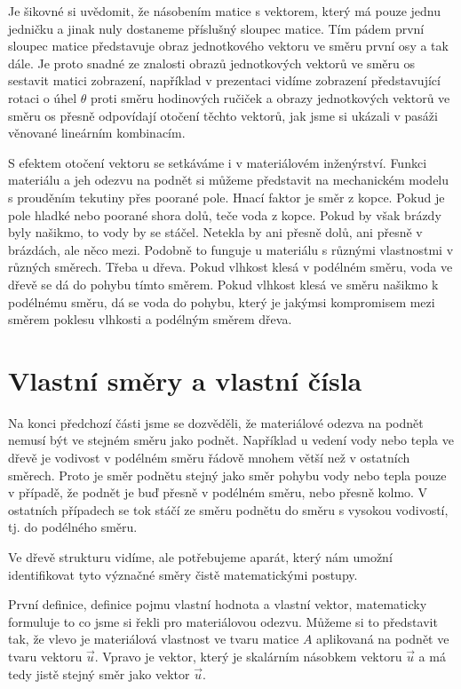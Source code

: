 \documentclass[12pt]{article}
\begin{document}
Je šikovné si uvědomit, že násobením matice s vektorem, který má pouze jednu jedničku a jinak nuly dostaneme příslušný sloupec matice. Tím pádem první sloupec matice představuje obraz jednotkového vektoru ve směru první osy a tak dále. Je proto snadné ze znalosti obrazů jednotkových vektorů ve směru os sestavit matici zobrazení, například v prezentaci vidíme zobrazení představující rotaci o úhel $\theta$ proti směru hodinových ručiček a obrazy jednotkových vektorů ve směru os přesně odpovídají otočení těchto vektorů, jak jsme si ukázali v pasáži věnované lineárním kombinacím.

S efektem otočení vektoru se setkáváme i v materiálovém inženýrství. Funkci materiálu a jeh odezvu na podnět si můžeme představit na mechanickém modelu s prouděním tekutiny přes poorané pole. Hnací faktor je směr z kopce. Pokud je pole hladké nebo poorané shora dolů, teče voda z kopce. Pokud by však brázdy byly našikmo, to vody by se stáčel. Netekla by ani přesně dolů, ani přesně v brázdách, ale něco mezi. Podobně to funguje u materiálu s různými vlastnostmi v různých směrech. Třeba u dřeva. Pokud vlhkost klesá v podélném směru, voda ve dřevě se dá do pohybu tímto směrem. Pokud vlhkost klesá ve směru našikmo k podélnému směru, dá se voda do pohybu, který je jakýmsi kompromisem mezi směrem poklesu vlhkosti a podélným směrem dřeva.

\section{Vlastní směry a vlastní čísla}

Na konci předchozí části jsme se dozvěděli, že materiálové odezva na podnět nemusí být ve stejném směru jako podnět. Například u vedení vody nebo tepla ve dřevě je vodivost v podélném směru řádově mnohem větší než v ostatních směrech. Proto je směr podnětu stejný jako směr pohybu vody nebo tepla pouze v případě, že podnět je buď přesně v podélném směru, nebo přesně kolmo. V ostatních případech se tok stáčí ze směru podnětu do směru s vysokou vodivostí, tj. do podélného směru.

Ve dřevě strukturu vidíme, ale potřebujeme aparát, který nám umožní identifikovat tyto význačné směry čistě matematickými postupy.

První definice, definice pojmu vlastní hodnota a vlastní vektor, matematicky formuluje to co jsme si řekli pro materiálovou odezvu. Můžeme si to představit tak, že vlevo je materiálová vlastnost ve tvaru matice $A$ aplikovaná na podnět ve tvaru vektoru $\vec u$. Vpravo je vektor, který je skalárním násobkem vektoru $\vec u$ a má tedy jistě stejný směr jako vektor $\vec u$.
\end{document}
